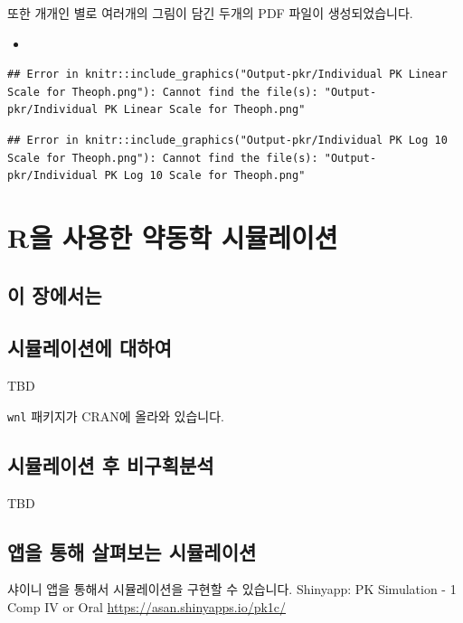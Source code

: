 \documentclass[
  10pt,
]{krantz}
\providecommand{\tightlist}{%
  \setlength{\itemsep}{0pt}\setlength{\parskip}{0pt}}
\begin{document}
또한 개개인 별로 여러개의 그림이 담긴 두개의 PDF 파일이 생성되었습니다.

\begin{itemize}
\tightlist
\item
\end{itemize}

\begin{verbatim}
## Error in knitr::include_graphics("Output-pkr/Individual PK Linear Scale for Theoph.png"): Cannot find the file(s): "Output-pkr/Individual PK Linear Scale for Theoph.png"
\end{verbatim}

\begin{verbatim}
## Error in knitr::include_graphics("Output-pkr/Individual PK Log 10 Scale for Theoph.png"): Cannot find the file(s): "Output-pkr/Individual PK Log 10 Scale for Theoph.png"
\end{verbatim}

\hypertarget{rsimulation}{%
\chapter{R을 사용한 약동학 시뮬레이션}\label{rsimulation}}

\hypertarget{summary-simulation}{%
\section{이 장에서는}\label{summary-simulation}}

\hypertarget{sim-about}{%
\section{시뮬레이션에 대하여}\label{sim-about}}

TBD

\texttt{wnl} 패키지가 CRAN에 올라와 있습니다.

\hypertarget{sim-nca}{%
\section{시뮬레이션 후 비구획분석}\label{sim-nca}}

TBD

\hypertarget{sim-app}{%
\section{앱을 통해 살펴보는 시뮬레이션}\label{sim-app}}

샤이니 앱을 통해서 시뮬레이션을 구현할 수 있습니다. Shinyapp: PK Simulation - 1 Comp IV or Oral \url{https://asan.shinyapps.io/pk1c/}
\end{document}
